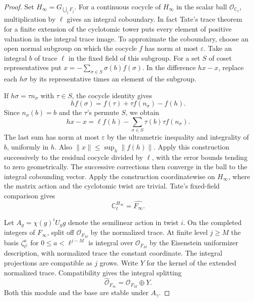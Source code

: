 \begin{proof}
Set \(H_\infty=G_{\bigcup_jF_j}\).
For a continuous cocycle of \(H_\infty\) in the scalar
ball \(\mathcal O_{\mathbb C_\ell}\), multiplication by
\(\ell\) gives an integral coboundary. In fact Tate's
trace theorem for a finite extension of the
cyclotomic tower puts every element of positive
valuation in the integral trace image. To approximate
the coboundary, choose an open normal subgroup on
which the cocycle \(f\) has norm at most \(\varepsilon\).
Take an integral \(b\) of trace \(\ell\) in the fixed
field of this subgroup. For a set \(S\) of coset
representatives put \(x=-\sum_{\sigma\in S}\sigma(b)f(\sigma)\).
In the difference \(hx-x\), replace each \(h\sigma\)
by its representative times an element of the subgroup.

If \(h\sigma=\tau n_\sigma\) with \(\tau\in S\), the
cocycle identity gives
\[
 h f(\sigma)=f(\tau)+ \tau f(n_\sigma)-f(h).
\]
Since \(n_\sigma(b)=b\) and the
\(\tau\)'s permute \(S\), we obtain
\[
       hx-x=\ell f(h)-\sum_{\sigma\in S}
                       \tau(b)\tau f(n_\sigma).
\]
The last sum has norm at most \(\varepsilon\) by the
ultrametric inequality and integrality of \(b\), uniformly
in \(h\).
Also \(\|x\|\le\sup_h\|f(h)\|\).
Apply this construction successively to the residual
cocycle divided by \(\ell\), with the error bounds
tending to zero geometrically. The successive corrections
then converge in the ball to the integral cobounding
vector. Apply the construction coordinatewise on
\(H_\infty\), where the matrix action and the
cyclotomic twist are trivial. Tate's fixed-field
comparison gives
\[
 \mathbb C_\ell^{H_\infty}=\widehat{F_\infty}.
\]

\cite[\S3, Propositions 9--10]{tate-pdivisible}

Let \(A_g=\chi(g)^iU_g g\) denote the semilinear
action in twist \(i\). On the completed integers of
\(F_\infty\), split off \(\mathcal O_{F_M}\) by the
normalized trace. At finite level \(j\ge M\) the
basis \(\zeta_{\ell^j}^{a}\) for
\(0\le a<\ell^{j-M}\) is integral over
\(\mathcal O_{F_M}\) by the Eisenstein uniformizer
description, with normalized trace the constant
coordinate. The integral projections are compatible
as \(j\) grows. Write \(Y\) for the kernel of the extended normalized trace. Compatibility gives the integral splitting
\[
 \widehat{\mathcal O}_{F_\infty}=\mathcal O_{F_M}\oplus Y.
\]
Both this module and the base are
stable under \(A_\gamma\).


\end{proof}
